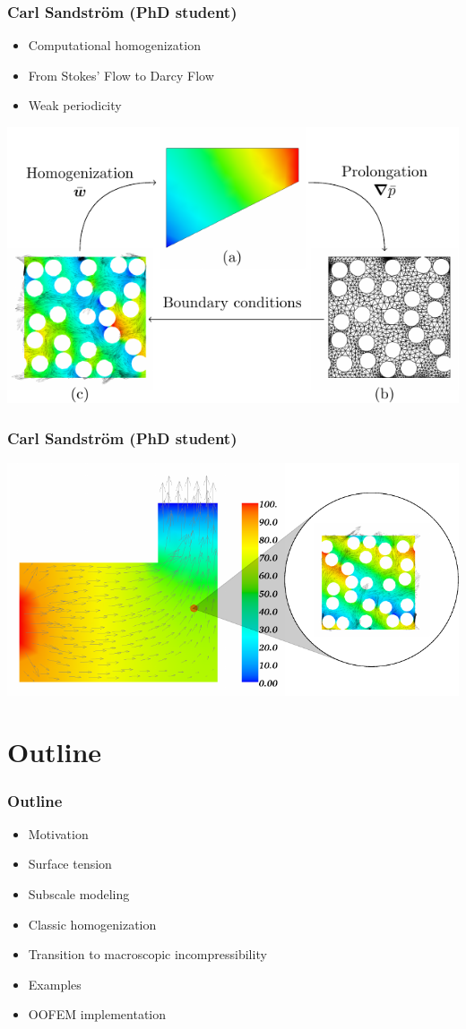 \documentclass[11pt]{beamer} %
\begin{document}
\begin{frame}
\frametitle{Carl Sandström (PhD student)}
 \begin{itemize}
  \item Computational homogenization
  \item From Stokes' Flow to Darcy Flow
  \item Weak periodicity
 \end{itemize}
 \begin{center}
 \includegraphics[width=0.8\linewidth]{figures/Bild1-crop.pdf}
 \end{center}
\end{frame}

\begin{frame}
 \frametitle{Carl Sandström (PhD student)}
 \includegraphics[width=1\linewidth]{figures/FrontPage-crop.pdf}
\end{frame}

\section{Outline}
\begin{frame}
 \frametitle{Outline}

\begin{itemize}
 \item Motivation
 \item Surface tension
 \item Subscale modeling
 \item Classic homogenization
 \item Transition to macroscopic incompressibility
 \item Examples
 \item OOFEM implementation
\end{itemize}
\end{frame}
\end{document}
